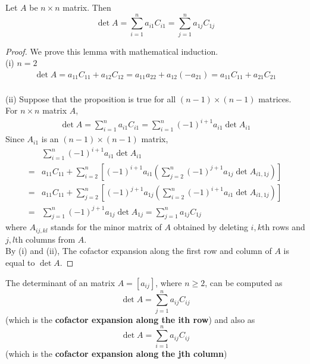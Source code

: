 \setcounter{theorem}{12}
\begin{lemma}
	Let $A$ be $n \times n$ matrix. Then
	\begin{equation*}
		\det{A} = \sum_{i=1}^{n}a_{i1}C_{i1} = \sum_{j=1}^{n}a_{1j}C_{1j}
	\end{equation*}
\end{lemma}
\begin{proof}
	We prove this lemma with mathematical induction. \\
	
	(i) $n = 2$ 
	\begin{align*}
		\det{A} = a_{11}C_{11} + a_{12}C_{12} = a_{11}a_{22} + a_{12}(-a_{21}) = a_{11}C_{11} + a_{21}C_{21}
	\end{align*} \\
	(ii) Suppose that the proposition is true for all $(n-1) \times (n-1)$ matrices. \\
	For $n \times n$ matrix $A$,
	\begin{align*}
		\det{A} = \sum_{i=1}^{n}a_{i1}C_{i1} = \sum_{i=1}^{n}(-1)^{i+1}a_{i1}\det{A_{i1}}
	\end{align*}
	Since $A_{i1}$ is an $(n-1) \times (n-1)$ matrix,
	\begin{align*}
		&\sum_{i=1}^{n}(-1)^{i+1}a_{i1}\det{A_{i1}} 
		\\ = & a_{11}C_{11} +  \sum_{i=2}^{n}[(-1)^{i+1}a_{i1}(\sum_{j=2}^{n}(-1)^{j+1}a_{1j}\det{A_{i1, 1j}})]
		\\ = & a_{11}C_{11} + \sum_{j=2}^{n}[(-1)^{j+1}a_{1j}(\sum_{i=2}^{n}(-1)^{i+1}a_{i1}\det{A_{i1, 1j}})]
		\\ = & \sum_{j=1}^{n}(-1)^{j+1}a_{1j}\det{A_{1j}} = \sum_{j=1}^{n} a_{1j}C_{1j}
	\end{align*}
	where $A_{ij, kl}$ stands for the minor matrix of $A$ obtained by deleting $i, k$th rows and $j, l$th columns from $A$. \\
	
	By (i) and (ii), The cofactor expansion along the first row and column of $A$ is equal to $\det{A}$.
\end{proof}

\setcounter{theorem}{0}
\begin{theorem}
	The determinant of an \nbyn matrix $ A=\left[a_{ij}\right] $, where $ n\geq 2 $, can be computed as 
	\begin{equation*}
	\det A = \sum_{j=1}^{n}{a_{ij}C_{ij}}
	\end{equation*}
	(which is the \textbf{cofactor expansion along the ith row}) and also as
	\begin{equation*}
	\det A = \sum_{i=1}^{n}{a_{ij}C_{ij}}
	\end{equation*}
	(which is the \textbf{cofactor expansion along the jth column})
\end{theorem}

